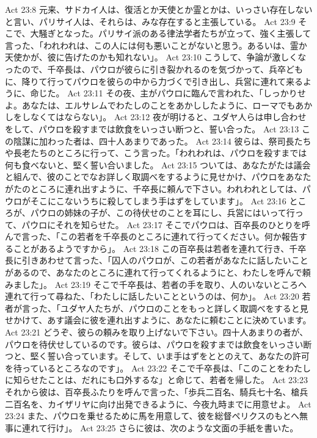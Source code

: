 Act 23:8  元来、サドカイ人は、復活とか天使とか霊とかは、いっさい存在しないと言い、パリサイ人は、それらは、みな存在すると主張している。
Act 23:9  そこで、大騒ぎとなった。パリサイ派のある律法学者たちが立って、強く主張して言った、「われわれは、この人には何も悪いことがないと思う。あるいは、霊か天使かが、彼に告げたのかも知れない」。
Act 23:10  こうして、争論が激しくなったので、千卒長は、パウロが彼らに引き裂かれるのを気づかって、兵卒どもに、降りて行ってパウロを彼らの中から力づくで引き出し、兵営に連れて来るように、命じた。
Act 23:11  その夜、主がパウロに臨んで言われた、「しっかりせよ。あなたは、エルサレムでわたしのことをあかししたように、ローマでもあかしをしなくてはならない」。
Act 23:12  夜が明けると、ユダヤ人らは申し合わせをして、パウロを殺すまでは飲食をいっさい断つと、誓い合った。
Act 23:13  この陰謀に加わった者は、四十人あまりであった。
Act 23:14  彼らは、祭司長たちや長老たちのところに行って、こう言った。「われわれは、パウロを殺すまでは何も食べないと、堅く誓い合いました。
Act 23:15  ついては、あなたがたは議会と組んで、彼のことでなお詳しく取調べをするように見せかけ、パウロをあなたがたのところに連れ出すように、千卒長に頼んで下さい。われわれとしては、パウロがそこにこないうちに殺してしまう手はずをしています」。
Act 23:16  ところが、パウロの姉妹の子が、この待伏せのことを耳にし、兵営にはいって行って、パウロにそれを知らせた。
Act 23:17  そこでパウロは、百卒長のひとりを呼んで言った、「この若者を千卒長のところに連れて行ってください。何か報告することがあるようですから」。
Act 23:18  この百卒長は若者を連れて行き、千卒長に引きあわせて言った、「囚人のパウロが、この若者があなたに話したいことがあるので、あなたのところに連れて行ってくれるようにと、わたしを呼んで頼みました」。
Act 23:19  そこで千卒長は、若者の手を取り、人のいないところへ連れて行って尋ねた、「わたしに話したいことというのは、何か」。
Act 23:20  若者が言った、「ユダヤ人たちが、パウロのことをもっと詳しく取調べをすると見せかけて、あす議会に彼を連れ出すように、あなたに頼むことに決めています。
Act 23:21  どうぞ、彼らの頼みを取り上げないで下さい。四十人あまりの者が、パウロを待伏せしているのです。彼らは、パウロを殺すまでは飲食をいっさい断つと、堅く誓い合っています。そして、いま手はずをととのえて、あなたの許可を待っているところなのです」。
Act 23:22  そこで千卒長は、「このことをわたしに知らせたことは、だれにも口外するな」と命じて、若者を帰した。
Act 23:23  それから彼は、百卒長ふたりを呼んで言った、「歩兵二百名、騎兵七十名、槍兵二百名を、カイザリヤに向け出発できるように、今夜九時までに用意せよ。
Act 23:24  また、パウロを乗せるために馬を用意して、彼を総督ペリクスのもとへ無事に連れて行け」。
Act 23:25  さらに彼は、次のような文面の手紙を書いた。
